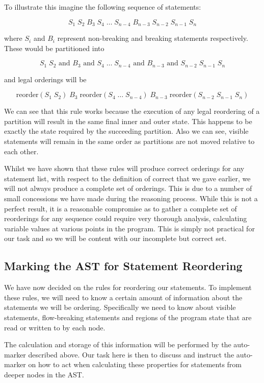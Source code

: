 \documentclass[twoside,a4paper]{report}
\begin{document}
To illustrate this imagine the following sequence of statements:

$$S_1 \; S_2 \; B_3 \; S_4 \; \ldots \; S_{n-4} \; B_{n-3} \; S_{n-2} \; S_{n-1} \; S_n$$

where $S_i$ and $B_i$ represent non-breaking and breaking statements respectively. These would be partitioned into

$$S_1 \; S_2 \text{ and } B_3 \text{ and } S_4 \; \ldots \; S_{n-4} \text{ and } B_{n-3} \text{ and } S_{n-2} \; S_{n-1} \; S_n$$

and legal orderings will be

$$\text{reorder}(S_1 \; S_2) \; B_3 \; \text{reorder}(S_4 \; \ldots \; S_{n-4}) \; B_{n-3} \; \text{reorder}(S_{n-2} \; S_{n-1} \; S_n)$$

We can see that this rule works because the execution of any legal reordering of a partition will result in the same final inner and outer state.
This happens to be exactly the state required by the succeeding partition. Also we can see, visible statements will remain in the same order as
partitions are not moved relative to each other.

Whilst we have shown that these rules will produce correct orderings for any statement list, with respect to the definition of correct that we gave earlier,
we will not always produce a complete set of orderings. This is due to a number of small concessions we have made during the reasoning process. While
this is not a perfect result, it is a reasonable compromise as to gather a complete set of reorderings for any sequence could require very thorough analysis,
calculating variable values at various points in the program. This is simply not practical for our task and so we will be content with our incomplete but
correct set.

\subsection{Marking the AST for Statement Reordering}

We have now decided on the rules for reordering our statements. To implement these rules, we will need to know a certain amount of information about
the statements we will be ordering. Specifically we need to know about visible statements, flow-breaking statements and regions of the program
state that are read or written to by each node.

The calculation and storage of this information will be performed by the auto-marker described above. Our task here is then to discuss and instruct
the auto-marker on how to act when calculating these properties for statements from deeper nodes in the AST.
\end{document}
